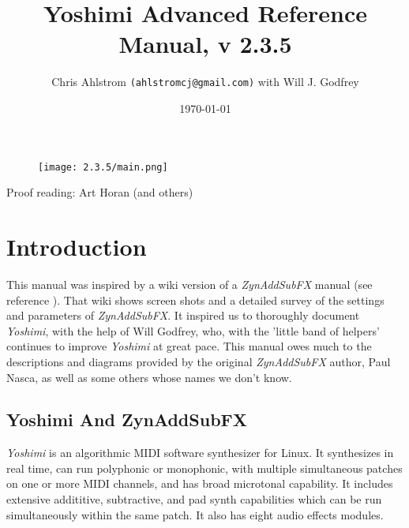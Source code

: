 \documentclass[
 11pt,
 twoside,
 a4paper,
 final                                 %
]{article}
\begin{document}
\title{Yoshimi Advanced Reference Manual, v 2.3.5}
\author{Chris Ahlstrom \texttt{(ahlstromcj@gmail.com)} with Will J. Godfrey}
\date{\today}
\maketitle

\begin{figure}[H]
   \centering
   \texttt{[image: 2.3.5/main.png]}
\end{figure}
\vfill
Proof reading: Art Horan (and others)
\clearpage                             %

\tableofcontents
\listoffigures                         %
\listoftables                          %

%

\setlength{\parindent}{2em}
\setlength{\parskip}{1ex plus 0.5ex minus 0.2ex}

\section{Introduction}
\label{sec:introduction}

   This manual was inspired by a wiki version of a
   \textsl{ZynAddSubFX} manual (see reference \cite{zynwiki}).  That wiki
   shows screen shots and a
   detailed survey of the settings and parameters of \textsl{ZynAddSubFX}.  It
   inspired us to thoroughly document \textsl{Yoshimi}, with the help of
   Will Godfrey, who, with the 'little band of helpers' continues to improve
   \textsl{Yoshimi} at great pace.
   This manual owes much to the descriptions and diagrams provided by the
   original \textsl{ZynAddSubFX} author, Paul Nasca, as well as some others
   whose names we don't know.

\subsection{Yoshimi And ZynAddSubFX}
\label{subsec:introduction_yoshimi_vs_zyn}

   \textsl{Yoshimi} is an algorithmic MIDI software synthesizer for Linux.
   It synthesizes in real time, can run polyphonic or monophonic, with multiple
   simultaneous patches on one or more MIDI channels, and has broad microtonal
   capability. It includes extensive addititive, subtractive,
   and pad synth capabilities which can be run simultaneously within the
   same patch.  It also has eight audio effects modules.
\end{document}
